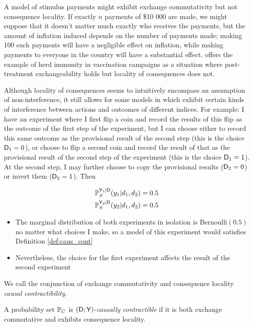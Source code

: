 A model of stimulus payments might exhibit exchange commutativity but not consequence locality. If exactly $n$ payments of \$10 000 are made, we might suppose that it doesn't matter much exactly who receives the payments, but the amount of inflation induced depends on the number of payments made; making 100 such payments will have a negligible effect on inflation, while making payments to everyone in the country will have a substantial effect. \citet{dawid_causal_2000} offers the example of herd immunity in vaccination campaigns as a situation where post-treatment exchangeability holds but locality of consequences does not.

Although locality of consequences seems to intuitively encompass an assumption of non-interference, it still allows for some models in which exhibit certain kinds of interference between actions and outcomes of different indices. For example: I have an experiment where I first flip a coin and record the results of this flip as the outcome of the first step of the experiment, but I can choose either to record this same outcome as the provisional result of the second step (this is the choice $\mathsf{D}_1=0$), or choose to flip a second coin and record the result of that as the provisional result of the second step of the experiment (this is the choice $\mathsf{D}_1=1$). At the second step, I may further choose to copy the provisional results ($\mathsf{D}_2=0$) or invert them ($\mathsf{D}_2=1$). Then

\begin{align}
    \mathbb{P}_S^{\mathsf{Y}_1|\mathsf{D}}(y_1|d_1,d_2) &= 0.5\\
    \mathbb{P}_S^{\mathsf{Y}_2|\mathsf{D}}(y_2|d_1,d_2) &= 0.5
\end{align}
\begin{itemize}
    \item The marginal distribution of both experiments in isolation is $\text{Bernoulli}(0.5)$ no matter what choices I make, so a model of this experiment would satisfies Definition \ref{def:caus_cont}
    \item Nevertheless, the choice for the first experiment affects the result of the second experiment
\end{itemize}

We call the conjunction of exchange commutativity and consequence locality \emph{causal contractibility}.

\begin{definition}
A probability set $\mathbb{P}_C$ is $(\mathsf{D};\mathsf{Y})$-\emph{causally contractible} if it is both exchange commutative and exhibits consequence locality.
\end{definition}

